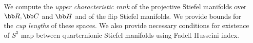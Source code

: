 We compute the \textit{upper characteristic rank} of the projective Stiefel manifolds over $\bb R, \bb C$ and $\bb H$ and of the flip Stiefel manifolds. We provide bounds for the \textit{cup lengths} of these spaces. We also provide necessary conditions for existence of $S^3$-map between quarternionic Stiefel manifolds using Fadell-Husseini index.